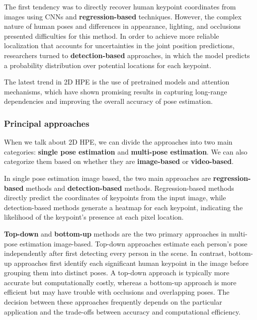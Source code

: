 The first tendency was to directly recover human keypoint coordinates from images using CNNs and \textbf{regression-based} techniques. However, the complex nature of human poses and differences in appearance, lighting, 
and occlusions presented difficulties for this method. In order to achieve more reliable localization that accounts for uncertainties in the joint position predictions, researchers turned to \textbf{detection-based} 
approaches, in which the model predicts a probability distribution over potential locations for each keypoint.

The latest trend in 2D HPE is the use of pretrained models and attention mechanisms, which have shown promising results in capturing long-range dependencies 
and improving the overall accuracy of pose estimation.

\subsubsection{Principal approaches}
When we talk about 2D HPE, we can divide the approaches into two main categories: \textbf{single pose estimation} and \textbf{multi-pose estimation}.
We can also categorize them based on whether they are \textbf{image-based} or \textbf{video-based}.

In single pose estimation image based, the two main approaches are \textbf{regression-based} methods and \textbf{detection-based} methods. Regression-based methods directly 
predict the coordinates of keypoints from the input image, while detection-based methods generate a heatmap for each keypoint, indicating the 
likelihood of the keypoint's presence at each pixel location.
\newpage

\textbf{Top-down} and \textbf{bottom-up} methods are the two primary approaches in multi-pose estimation image-based. Top-down approaches estimate each person's pose independently after first 
detecting every person in the scene. In contrast, bottom-up approaches first identify each significant human keypoint in the image before grouping them into distinct poses. A top-down approach 
is typically more accurate but computationally costly, whereas a bottom-up approach is more efficient but may have trouble with occlusions and overlapping poses. The decision between these 
approaches frequently depends on the particular application and the trade-offs between accuracy and computational efficiency.

